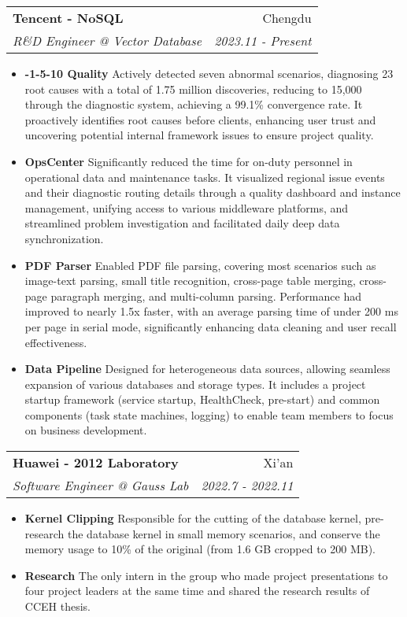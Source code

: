 \documentclass[letterpaper,10pt]{article}
\makeatletter
\newcommand{\resumeItem}[2]{
  \item\small{
    \textbf{\:#1}{ #2 \vspace{-4pt}}
  }
}
\newcommand{\resumeSubheading}[4]{
  \vspace{-1pt}\item
    \begin{tabular*}{0.97\textwidth}[t]{l@{\extracolsep{\fill}}r}
      \textbf{#1} & #2 \\
      \textit{\small#3} & \textit{\small #4} \\
    \end{tabular*}\vspace{-6pt}
}
\newcommand{\resumeItemListStart}{\begin{itemize}}
\newcommand{\resumeItemListEnd}{\end{itemize}\vspace{-5pt}}
\makeatother
\begin{document}
    \resumeSubheading
      {Tencent - NoSQL}{Chengdu}
      {R\&D Engineer @ Vector Database}{ 2023.11 - Present}
      \resumeItemListStart
      	\resumeItem{0-1-5-10 Quality}
		{Actively detected seven abnormal scenarios, diagnosing 23 root causes with a total of 1.75 million discoveries, reducing to 15,000 through the diagnostic system, achieving a 99.1\% convergence rate. It proactively identifies root causes before clients, enhancing user trust and uncovering potential internal framework issues to ensure project quality.}
		\resumeItem{OpsCenter}
        {Significantly reduced the time for on-duty personnel in operational data and maintenance tasks. It visualized regional issue events and their diagnostic routing details through a quality dashboard and instance management, unifying access to various middleware platforms, and streamlined problem investigation and facilitated daily deep data synchronization.}
		\resumeItem{PDF Parser}
        {Enabled PDF file parsing, covering most scenarios such as image-text parsing, small title recognition, cross-page table merging, cross-page paragraph merging, and multi-column parsing. Performance had improved to nearly 1.5x faster, with an average parsing time of under 200 ms per page in serial mode, significantly enhancing data cleaning and user recall effectiveness.}
		\resumeItem{Data Pipeline}
        {Designed for heterogeneous data sources, allowing seamless expansion of various databases and storage types. It includes a project startup framework (service startup, HealthCheck, pre-start) and common components (task state machines, logging) to enable team members to focus on business development.}
      \resumeItemListEnd

    \resumeSubheading
      {Huawei - 2012 Laboratory}{Xi'an}
      {Software Engineer @ Gauss Lab}{ 2022.7 - 2022.11}
      \resumeItemListStart
      	\resumeItem{Kernel Clipping}
		{Responsible for the cutting of the database kernel, pre-research the database kernel in small memory scenarios, and conserve the memory usage to 10\% of the original (from 1.6 GB cropped to 200 MB).}
		\resumeItem{Research}
        {The only intern in the group who made project presentations to four project leaders at the same time and shared the research results of CCEH thesis.}
      \resumeItemListEnd
          
    
\end{document}
